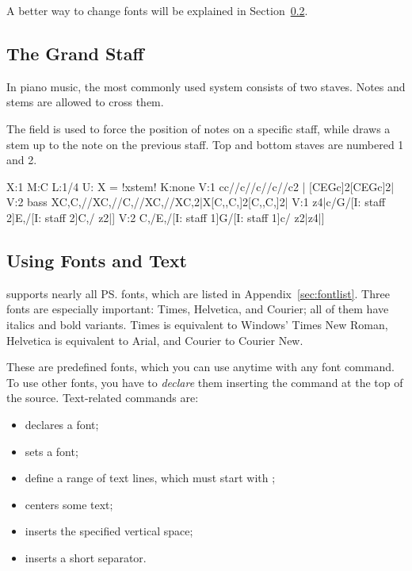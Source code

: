 \documentclass[a4paper,fullpage,12pt]{book}
\begin{document}

A better way to change fonts will be explained in
Section~\ref{sec:usingfonts}.


\subsection{The Grand Staff}
\label{sec:grandstaff}

In piano music, the most commonly used system consists of two staves.
Notes and stems are allowed to cross them.

The  field is used to force the position of
notes on a specific staff, while  draws a stem up to the
note on the previous staff. Top and bottom staves are numbered 1 and
2.

\begin{abcsource}
X:1
M:C
L:1/4
U: X = !xstem!
K:none
V:1
cc//c//c//c//c2 | [CEGc]2[CEGc]2|
V:2 bass
XC,C,//XC,//C,//XC,//XC,2|X[C,,C,]2[C,,C,]2|
V:1
z4|c/G/[I: staff 2]E,/[I: staff 2]C,/ z2|]
V:2
C,/E,/[I: staff 1]G/[I: staff 1]c/ z2|z4|]
\end{abcsource}



\subsection{Using Fonts and Text}
\label{sec:usingfonts}

\abcm{} supports nearly all \ps{} fonts, which are listed in
Appendix~\ref{sec:fontlist}. Three fonts are especially important:
Times, Helvetica, and Courier; all of them have italics and bold
variants. Times is equivalent to Windows' Times New Roman, Helvetica
is equivalent to Arial, and Courier to Courier New.

These are predefined fonts, which you can use anytime with any font
command. To use other fonts, you have to \emph{declare} them inserting
the  command at the top of the source. Text-related
commands are:

\begin{itemize}
  
  \item {} declares a font;
  
  \item {} sets a font;
  
  \item {} define a range of
  text lines, which must start with \metacmd{};
  
  \item {} centers some text;
  
  \item {} inserts the specified vertical space;
  
  \item {} inserts a short separator.

\end{itemize}
\end{document}
